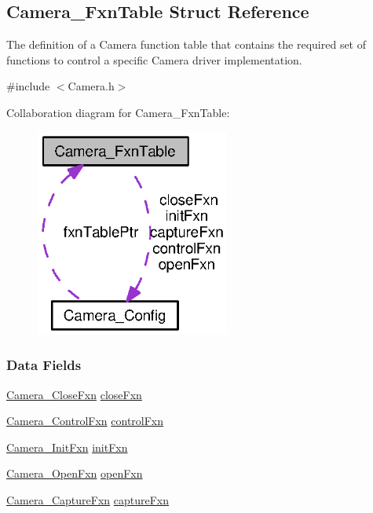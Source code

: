 \subsection{Camera\+\_\+\+Fxn\+Table Struct Reference}
\label{struct_camera___fxn_table}


The definition of a Camera function table that contains the required set of functions to control a specific Camera driver implementation.  




{\ttfamily \#include $<$Camera.\+h$>$}



Collaboration diagram for Camera\+\_\+\+Fxn\+Table\+:
\nopagebreak
\begin{figure}[H]
\begin{center}
\leavevmode
\includegraphics[width=181pt]{struct_camera___fxn_table__coll__graph}
\end{center}
\end{figure}
\subsubsection*{Data Fields}
\begin{DoxyCompactItemize}
\item 
\hyperlink{_camera_8h_ae6f2789af3ea253197fd2ce98db352f4}{Camera\+\_\+\+Close\+Fxn} \hyperlink{struct_camera___fxn_table_af279c6a9d953882c3d7ce26da6899ad7}{close\+Fxn}
\item 
\hyperlink{_camera_8h_ae81dd59b680fa8d7a3a9f8fc226f593f}{Camera\+\_\+\+Control\+Fxn} \hyperlink{struct_camera___fxn_table_a4f2a817f5f93b5c30f25830a75b524aa}{control\+Fxn}
\item 
\hyperlink{_camera_8h_a3b6d043e96bfc1f1443521ef10ea01f3}{Camera\+\_\+\+Init\+Fxn} \hyperlink{struct_camera___fxn_table_a785c5f005aa70b0205f5a24f5286ac02}{init\+Fxn}
\item 
\hyperlink{_camera_8h_a589bec3690a5b7c7890a0e411a1cad9f}{Camera\+\_\+\+Open\+Fxn} \hyperlink{struct_camera___fxn_table_a1a1ffb4979ca2e85f513b06bc32794cb}{open\+Fxn}
\item 
\hyperlink{_camera_8h_a2096274266d6a07b48ee25d8f43805a0}{Camera\+\_\+\+Capture\+Fxn} \hyperlink{struct_camera___fxn_table_a68229a53d38db79a70137aff58e394ff}{capture\+Fxn}
\end{DoxyCompactItemize}


